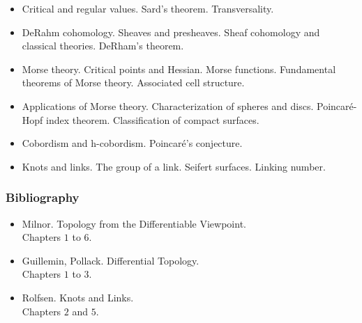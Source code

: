 \documentclass[spanish]{article}
\begin{document}
\begin{itemize}
  \item
Critical and regular values. Sard's theorem. Transversality.

  \item
DeRahm cohomology. Sheaves and presheaves. Sheaf cohomology and classical
theories. DeRham's theorem.

  \item
Morse theory. Critical points and Hessian. Morse functions. Fundamental
theorems of Morse theory. Associated cell structure.

  \item
Applications of Morse theory. Characterization of spheres and discs.
Poincar\'e-Hopf index theorem. Classification of compact surfaces.

  \item
Cobordism and h-cobordism. Poincar\'e's conjecture.

  \item
Knots and links. The group of a link. Seifert surfaces. Linking number.

\end{itemize}



\subsubsection{Bibliography}
\begin{itemize}
  \item
Milnor. Topology from the Differentiable Viewpoint.\\
Chapters $1$ to $6$.

  \item
Guillemin, Pollack. Differential Topology.\\
Chapters $1$ to $3$.

  \item
Rolfsen. Knots and Links.\\
Chapters $2$ and $5$.

\end{itemize}
\end{document}
